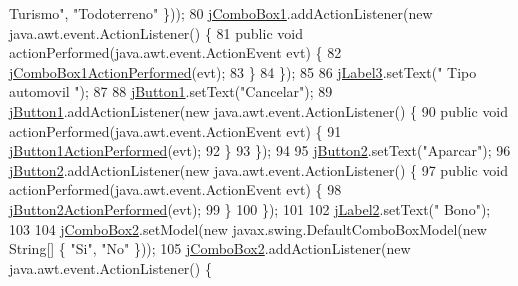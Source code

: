\begin{DoxyCode}
{      Turismo"}, \textcolor{stringliteral}{"Todoterreno"} \}));
80         \mbox{\hyperlink{classejercicio2_1_1_automovil_interfaz_af9e55c9052d02aceba060beb8283c4f2}{jComboBox1}}.addActionListener(\textcolor{keyword}{new} java.awt.event.ActionListener() \{
81             \textcolor{keyword}{public} \textcolor{keywordtype}{void} actionPerformed(java.awt.event.ActionEvent evt) \{
82                 \mbox{\hyperlink{classejercicio2_1_1_automovil_interfaz_a250dab0b1f55b81b783a0a0862891584}{jComboBox1ActionPerformed}}(evt);
83             \}
84         \});
85 
86         \mbox{\hyperlink{classejercicio2_1_1_automovil_interfaz_aa01e4eef9c730b99950e3bbce2ecd80d}{jLabel3}}.setText(\textcolor{stringliteral}{"  Tipo automovil "});
87 
88         \mbox{\hyperlink{classejercicio2_1_1_automovil_interfaz_a75207245626e5d71c200b02b55319a87}{jButton1}}.setText(\textcolor{stringliteral}{"Cancelar"});
89         \mbox{\hyperlink{classejercicio2_1_1_automovil_interfaz_a75207245626e5d71c200b02b55319a87}{jButton1}}.addActionListener(\textcolor{keyword}{new} java.awt.event.ActionListener() \{
90             \textcolor{keyword}{public} \textcolor{keywordtype}{void} actionPerformed(java.awt.event.ActionEvent evt) \{
91                 \mbox{\hyperlink{classejercicio2_1_1_automovil_interfaz_a48ab723d1cfb8e8d2bbbf13da2bbf276}{jButton1ActionPerformed}}(evt);
92             \}
93         \});
94 
95         \mbox{\hyperlink{classejercicio2_1_1_automovil_interfaz_ac92a1987525c5e7afa6eee2ae7d74787}{jButton2}}.setText(\textcolor{stringliteral}{"Aparcar"});
96         \mbox{\hyperlink{classejercicio2_1_1_automovil_interfaz_ac92a1987525c5e7afa6eee2ae7d74787}{jButton2}}.addActionListener(\textcolor{keyword}{new} java.awt.event.ActionListener() \{
97             \textcolor{keyword}{public} \textcolor{keywordtype}{void} actionPerformed(java.awt.event.ActionEvent evt) \{
98                 \mbox{\hyperlink{classejercicio2_1_1_automovil_interfaz_a3629812b4c3141b32100171144e84be5}{jButton2ActionPerformed}}(evt);
99             \}
100         \});
101 
102         \mbox{\hyperlink{classejercicio2_1_1_automovil_interfaz_a70af4ec3e989a5ed4b835e00e84690c8}{jLabel2}}.setText(\textcolor{stringliteral}{"         Bono"});
103 
104         \mbox{\hyperlink{classejercicio2_1_1_automovil_interfaz_a787595d150a8ebd65cb621823b577788}{jComboBox2}}.setModel(\textcolor{keyword}{new} javax.swing.DefaultComboBoxModel(\textcolor{keyword}{new} String[] \{ \textcolor{stringliteral}{"Si"}, \textcolor{stringliteral}{"No"} \}));
105         \mbox{\hyperlink{classejercicio2_1_1_automovil_interfaz_a787595d150a8ebd65cb621823b577788}{jComboBox2}}.addActionListener(\textcolor{keyword}{new} java.awt.event.ActionListener() \{

\end{DoxyCode}
